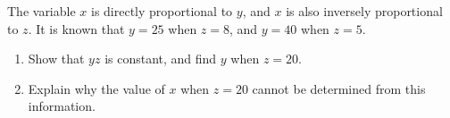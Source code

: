The variable $x$ is directly proportional to $y$, and $x$ is also inversely proportional to $z$. It is known that $y=25$ when $z=8$, and $y=40$ when $z=5$.
\begin{enumerate}
\item[(a)] Show that $yz$ is constant, and find $y$ when $z=20$.
\item[(b)] Explain why the value of $x$ when $z=20$ cannot be determined from this information.
\end{enumerate}
